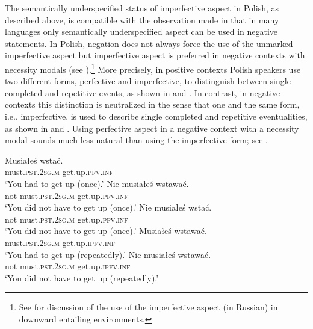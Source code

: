 \documentclass[output=paper]{langscibook}
\begin{document}
The semantically underspecified status of imperfective aspect in Polish, as described above, is compatible with the observation made in \citet{AikhenvaldandDixon1998} that in many languages only semantically underspecified aspect can be used in negative statements. In Polish, negation does not always force the use of the unmarked imperfective aspect but imperfective aspect is preferred in negative contexts with necessity modals (see \citealt{KlimekJankowskaCzypionkaWitkowskiandBłaszczak2018}).\footnote{See \citet{Kagan2008, Kagan2010} for discussion of the use of the imperfective aspect (in Russian) in downward entailing environments.}  More precisely, in positive contexts Polish speakers use two different forms, perfective and imperfective, to distinguish between single completed and repetitive events, as shown in  and . In contrast, in negative contexts this distinction is neutralized in the sense that one and the same form, i.e., imperfective, is used to describe single completed and repetitive eventualities, as shown in  and . Using perfective aspect in a negative context with a necessity modal sounds much less natural than using the imperfective form; see .\largerpage

\ea\label{jan-bla:fansb:kb:ex8}
\ea \gll Musiałeś wstać.\\  
        must.\textsc{pst}.\textsc{2sg}.\textsc{m}  get.up.\textsc{pfv}.\textsc{inf}\\
\glt ‘You had to get up (once).’\label{jan-bla:fansb:kb:ex8a}
\ex \gll Nie musiałeś wstawać.\\  
        not must.\textsc{pst}.\textsc{2sg}.\textsc{m} get.up.\textsc{pfv}.\textsc{inf}\\
\glt ‘You did not have to get up (once).’\label{jan-bla:fansb:kb:ex8b}
\ex \gll Nie musiałeś wstać.\\  
        not must.\textsc{pst}.\textsc{2sg}.\textsc{m}  get.up.\textsc{pfv}.\textsc{inf}\\
\glt ‘You did not have to get up (once).’\label{jan-bla:fansb:kb:ex8c}
\z
\ex\label{jan-bla:fansb:kb:ex9}
\ea \gll Musiałeś wstawać.\\  
        must.\textsc{pst}.\textsc{2sg}.\textsc{m}  get.up.\textsc{ipfv}.\textsc{inf}\\
\glt ‘You had to get up (repeatedly).’\label{jan-bla:fansb:kb:ex9a}
\ex \gll Nie musiałeś wstawać.\\  
        not must.\textsc{pst}.\textsc{2sg}.\textsc{m} get.up.\textsc{ipfv}.\textsc{inf}\\
\glt ‘You did not have to get up (repeatedly).’\label{jan-bla:fansb:kb:ex9b}
\z
\z
\end{document}
